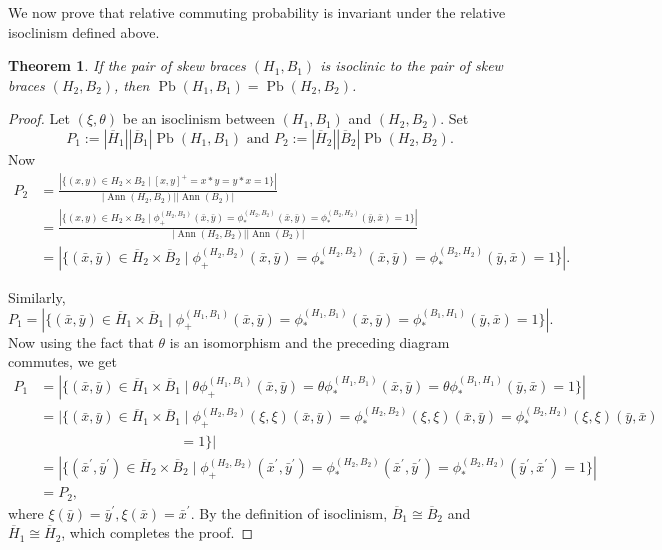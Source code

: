 \documentclass[10pt,a4paper]{amsart}
\numberwithin{equation}{section}
\newtheorem{thm}[equation]{Theorem}
\newcommand{\Pb}{\operatorname{Pb} }
\newcommand{\Ann}{\operatorname{Ann} }
\begin{document}
 We now prove that relative commuting probability is invariant under the relative  isoclinism defined above.
 \begin{thm}\label{relative isoclinism and commuting probability}
       If the pair of skew braces $(H_1,B_1)$ is isoclinic to the pair of skew braces $(H_2,B_2)$, then $\Pb(H_1,B_1) = \Pb(H_2,B_2)$.
 \end{thm}
 \begin{proof}
       Let $(\xi,\theta)$ be an isoclinism between $(H_1,B_1)$ and $(H_2,B_2)$. Set 
       $$P_1 := |\overline{H}_1||\overline{B}_1|\Pb(H_1,B_1) \mbox{ and } P_2:= |\overline{H}_2||\overline{B}_2|\Pb(H_2,B_2).$$ 
       Now
      \begin{align*}
        P_2  &=\frac{|\{(x,y)\in H_2\times B_2 \mid [x,y]^+=x\ast y=y\ast x=1\}|}{|\Ann(H_2,B_2)||\Ann(B_2)|}\\
            &=\frac{|\{(x,y)\in H_2\times B_2 \mid \phi_+^{(H_2,B_2)}(\bar{x},\bar{y})=\phi_\ast ^{(H_2,B_2)}(\bar{x},\bar{y})=\phi_\ast ^{(B_2,H_2)}(\bar{y},\bar{x})=1\}|}{|\Ann(H_2,B_2)||\Ann(B_2)|}\\
            &=|\{(\bar{x},\bar{y})\in \overline{H}_2 \times \overline{B}_2\mid \phi_+^{(H_2,B_2)}(\bar{x},\bar{y})=\phi_\ast ^{(H_2,B_2)}(\bar{x},\bar{y})=\phi_\ast ^{(B_2,H_2)}(\bar{y},\bar{x})=1\}|.
      \end{align*}

      Similarly,
      $$P_1=|\{(\bar{x},\bar{y})\in \overline{H}_1\times \overline{B}_1\mid \phi_+^{(H_1,B_1)}(\bar{x},\bar{y})=\phi_\ast ^{(H_1,B_1)}(\bar{x},\bar{y})=\phi_\ast ^{(B_1,H_1)}(\bar{y},\bar{x})=1\}|.$$
      Now using the fact that $\theta$ is an isomorphism and the preceding diagram commutes, we get
      \begin{align*}
            P_1  &=|\{(\bar{x},\bar{y})\in \overline{H}_1 \times \overline{B}_1 \mid \theta \phi_+^{(H_1,B_1)}(\bar{x},\bar{y})=\theta \phi_\ast ^{(H_1,B_1)}(\bar{x},\bar{y})=\theta \phi_\ast ^{(B_1,H_1)}(\bar{y},\bar{x})=1\}|\\
            &=|\{(\bar{x},\bar{y})\in \overline{H}_1\times \overline{B}_1\mid\phi_+^{(H_2,B_2)}(\xi,\xi)(\bar{x},\bar{y})=\phi_\ast ^{(H_2,B_2)}(\xi,\xi)(\bar{x},\bar{y})  =\phi_\ast ^{(B_2,H_2)}(\xi,\xi)(\bar{y},\bar{x})\\
            & \quad \quad \quad \quad \hspace{1in}=1\}|\\
            &=|\{(\bar{x}^\prime,\bar{y}^\prime)\in \overline{H}_2\times \overline{B}_2\mid \phi_+^{(H_2,B_2)}(\bar{x}^\prime,\bar{y}^\prime)=\phi_\ast ^{(H_2,B_2)}(\bar{x}^\prime,\bar{y}^\prime)=\phi_\ast ^{(B_2,H_2)}(\bar{y}^\prime,\bar{x}^\prime)=1\}|\\
            & = P_2,
  \end{align*}
 where $\xi (\bar{y})=\bar{y}^\prime,\xi (\bar{x})=\bar{x}^\prime$. 
By the definition of isoclinism, $\overline{B}_1\cong \overline{B}_2$ and $\overline{H}_1 \cong \overline{H}_2$, which completes the proof. 
 \end{proof}
\end{document}
